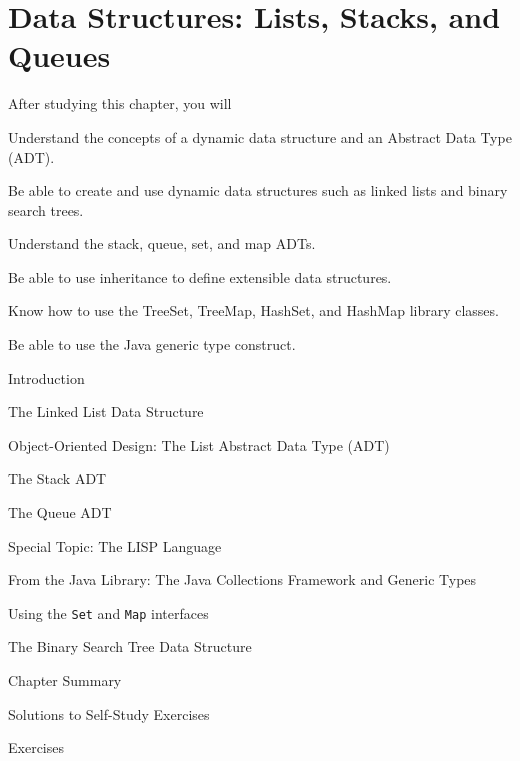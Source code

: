 

\setcounter{SSTUDYcount}{1}
\setcounter{chapter}{15}

\chapter{Data Structures: Lists, Stacks, and Queues}
\label{chapter-datastructures}



\CObegin
{}
\noindent After studying this chapter, you will

\begin{COBL}
\item  Understand the concepts of a dynamic data structure and an 
Abstract Data Type (ADT).
\item  Be able to create and use dynamic data structures
such as linked lists and binary search trees.
\item  Understand the stack, queue, set, and map ADTs.
\item  Be able to use inheritance to define extensible data structures.
\item  Know how to use the TreeSet, TreeMap, HashSet, and HashMap 
library classes.
\item  Be able to use the Java generic type construct.
\end{COBL}

\begin{COL}
\item  {Introduction}
\item  {The Linked List Data Structure}
\item  {Object-Oriented Design: The List Abstract Data Type (ADT)}
\item  {The Stack ADT}
\item  {The Queue ADT}
\item[] {{\color{cyan}Special Topic:}  The LISP Language}
\item {From the Java Library: The Java Collections Framework and Generic Types}
\item {Using the {\tt Set} and {\tt Map} interfaces}
\item {The Binary Search Tree Data Structure}
\par\small\item[] {Chapter Summary}
\par\small\item[] {Solutions to Self-Study Exercises}
\par\small\item[] {Exercises}
\end{COL}
\COend



